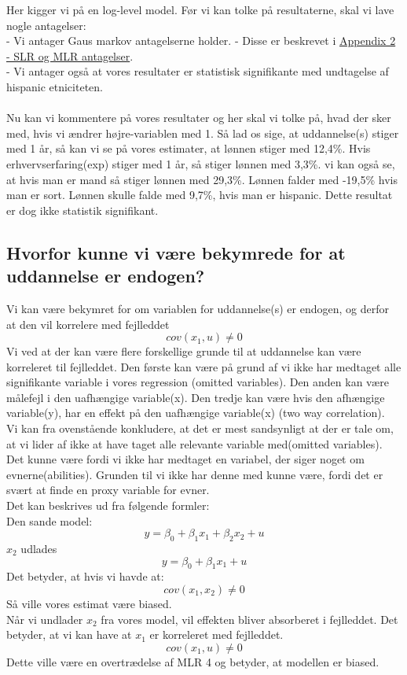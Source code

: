 \documentclass[
  10pt,
]{article}
\begin{document}
Her kigger vi på en log-level model. Før vi kan tolke på resultaterne,
skal vi lave nogle antagelser:\\
- Vi antager Gaus markov antagelserne holder. - Disse er beskrevet i
\hyperref[sec:SLR]{Appendix 2 - SLR og MLR antagelser}.\\
- Vi antager også at vores resultater er statistisk signifikante med
undtagelse af hispanic etniciteten.\\
~\\
Nu kan vi kommentere på vores resultater og her skal vi tolke på, hvad
der sker med, hvis vi ændrer højre-variablen med 1. Så lad os sige, at
uddannelse(s) stiger med 1 år, så kan vi se på vores estimater, at
lønnen stiger med 12,4\%. Hvis erhvervserfaring(exp) stiger med 1 år, så
stiger lønnen med 3,3\%. vi kan også se, at hvis man er mand så stiger
lønnen med 29,3\%. Lønnen falder med -19,5\% hvis man er sort. Lønnen
skulle falde med 9,7\%, hvis man er hispanic. Dette resultat er dog ikke
statistik signifikant.

\hypertarget{hvorfor-kunne-vi-vuxe6re-bekymrede-for-at-uddannelse-er-endogen}{%
\subsection{Hvorfor kunne vi være bekymrede for at uddannelse er
endogen?}\label{hvorfor-kunne-vi-vuxe6re-bekymrede-for-at-uddannelse-er-endogen}}

Vi kan være bekymret for om variablen for uddannelse(s) er endogen, og
derfor at den vil korrelere med fejlleddet \[cov(x_1,u)\neq0\] Vi ved at
der kan være flere forskellige grunde til at uddannelse kan være
korreleret til fejlleddet. Den første kan være på grund af vi ikke har
medtaget alle signifikante variable i vores regression (omitted
variables). Den anden kan være målefejl i den uafhængige variable(x).
Den tredje kan være hvis den afhængige variable(y), har en effekt på den
uafhængige variable(x) (two way correlation).\\

Vi kan fra ovenstående konkludere, at det er mest sandsynligt at der er
tale om, at vi lider af ikke at have taget alle relevante variable
med(omitted variables). Det kunne være fordi vi ikke har medtaget en
variabel, der siger noget om evnerne(abilities). Grunden til vi ikke har
denne med kunne være, fordi det er svært at finde en proxy variable for
evner.\\
Det kan beskrives ud fra følgende formler:\\
Den sande model: \[ y=\beta_0+\beta_1x_1+\beta_2x_2+u \tag{1}\] \(x_2\)
udlades \[y=\beta_0+\beta_1x_1+u \tag{2}\] Det betyder, at hvis vi havde
at: \[cov(x_1,x_2)\neq0\] Så ville vores estimat være biased.\\
Når vi undlader \(x_2\) fra vores model, vil effekten bliver absorberet
i fejlleddet. Det betyder, at vi kan have at \(x_1\) er korreleret med
fejlleddet. \[cov(x_1,u)\neq 0\] Dette ville være en overtrædelse af MLR
4 og betyder, at modellen er biased.
\end{document}
